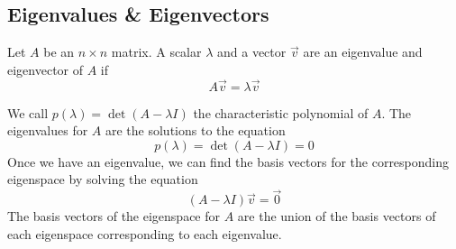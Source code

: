 \subsection{Eigenvalues \& Eigenvectors}
\begin{definition}
	Let $A$ be an $n \times n$ matrix. A scalar $\lambda$ and a vector $\vec{v}$ are an eigenvalue and eigenvector of $A$ if
	\begin{equation*}
		A\vec{v} = \lambda\vec{v}
	\end{equation*}
\end{definition}
\noindent
We call $p(\lambda) = \det{(A - \lambda I)}$ the characteristic polynomial of $A$. The eigenvalues for $A$ are the solutions to the equation
\begin{equation*}
	p(\lambda) = \det{(A - \lambda I)} = 0
\end{equation*}
Once we have an eigenvalue, we can find the basis vectors for the corresponding eigenspace by solving the equation
\begin{equation*}
	\left( A - \lambda I \right)\vec{v} = \vec{0}
\end{equation*}
The basis vectors of the eigenspace for $A$ are the union of the basis vectors of each eigenspace corresponding to each eigenvalue.

\ifodd{}\fi